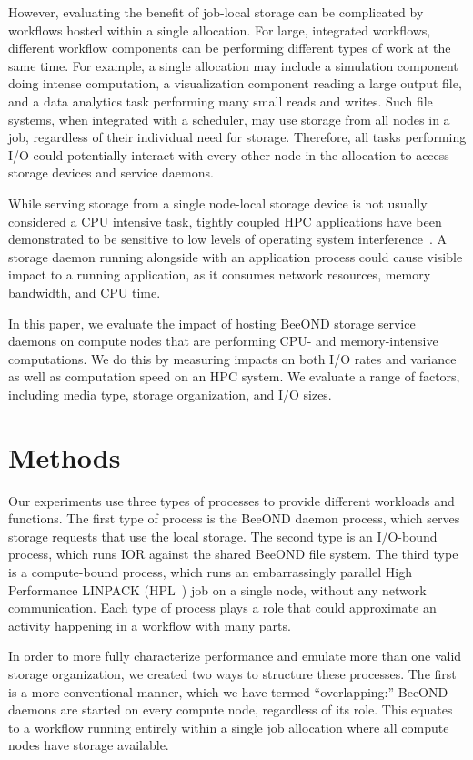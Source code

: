 \documentclass[conference]{IEEEtran}
\begin{document}
However, evaluating the benefit of job-local storage can be
complicated by workflows hosted within a single allocation.  For
large, integrated workflows, different workflow components can be
performing different types of work at the same time. For example, a
single allocation may include a simulation component doing intense
computation, a visualization component reading a large output file,
and a data analytics task performing many small reads and writes. Such
file systems, when integrated with a scheduler, may use storage from
all nodes in a job, regardless of their individual need for
storage. Therefore, all tasks performing I/O could potentially
interact with every other node in the allocation to access storage
devices and service daemons.

While serving storage from a single node-local storage device is not
usually considered a CPU intensive task, tightly coupled HPC
applications have been demonstrated to be sensitive to low levels of
operating system interference~\cite{noise}. A storage daemon running
alongside with an application process could cause visible impact to a
running application, as it consumes network resources, memory
bandwidth, and CPU time.

In this paper, we evaluate the impact of hosting BeeOND storage
service daemons on compute nodes that are performing CPU- and
memory-intensive computations. We do this by measuring impacts on both
I/O rates and variance as well as computation speed on an HPC
system. We evaluate a range of factors, including media type, storage
organization, and I/O sizes.

\section{Methods}

Our experiments use three types of processes to provide different
workloads and functions. The first type of process is the BeeOND
daemon process, which serves storage requests that use the local
storage. The second type is an I/O-bound process, which runs IOR
against the shared BeeOND file system. The third type is a
compute-bound process, which runs an embarrassingly parallel High Performance
LINPACK (HPL~\cite{hpl}) job on a single node, without any network
communication. Each type of process plays a role that could
approximate an activity happening in a workflow with many parts.

In order to more fully characterize performance and emulate more than
one valid storage organization, we created two ways to structure these
processes. The first is a more conventional manner, which we have
termed ``overlapping:'' BeeOND daemons are started on every compute
node, regardless of its role. This equates to a workflow running
entirely within a single job allocation where all compute nodes have
storage available.
\end{document}
